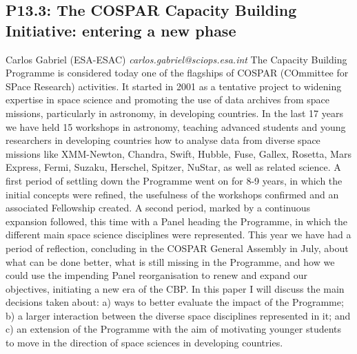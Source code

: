 \documentclass{report}
\begin{document}
\subsection*{P13.3: The COSPAR Capacity Building Initiative: entering a new phase}
\bigskip
Carlos Gabriel (ESA-ESAC) \newline   \newline   \newline   \newline  \newline  \newline\newline
{\it carlos.gabriel@sciops.esa.int}\newline
\newline\newline
The Capacity Building Programme is considered today one of the flagships of COSPAR
(COmmittee for SPace Research) activities. It started in 2001 as a tentative project to widening
expertise in space science and promoting the use of data archives from space missions,
particularly in astronomy, in developing countries. In the last 17 years we have held 15 workshops
in astronomy, teaching advanced students and young researchers in developing countries how to
analyse data from diverse space missions like XMM-Newton, Chandra, Swift, Hubble, Fuse,
Gallex, Rosetta, Mars Express, Fermi, Suzaku, Herschel, Spitzer, NuStar, as well as related
science.
A first period of settling down the Programme went on for 8-9 years, in which the initial concepts
were refined, the usefulness of the workshops confirmed and an associated Fellowship created. A
second period, marked by a continuous expansion followed, this time with a Panel heading the
Programme, in which the different main space science disciplines were represented. This year we
have had a period of reflection, concluding in the COSPAR General Assembly in July, about what
can be done better, what is still missing in the Programme, and how we could use the impending
Panel reorganisation to renew and expand our objectives, initiating a new era of the CBP.
In this paper I will discuss the main decisions taken about: a) ways to better evaluate the impact of
the Programme; b) a larger interaction between the diverse space disciplines represented in it; and
c) an extension of the Programme with the aim of motivating younger students to move in the
direction of space sciences in developing countries.\newline
\newpage
\end{document}
